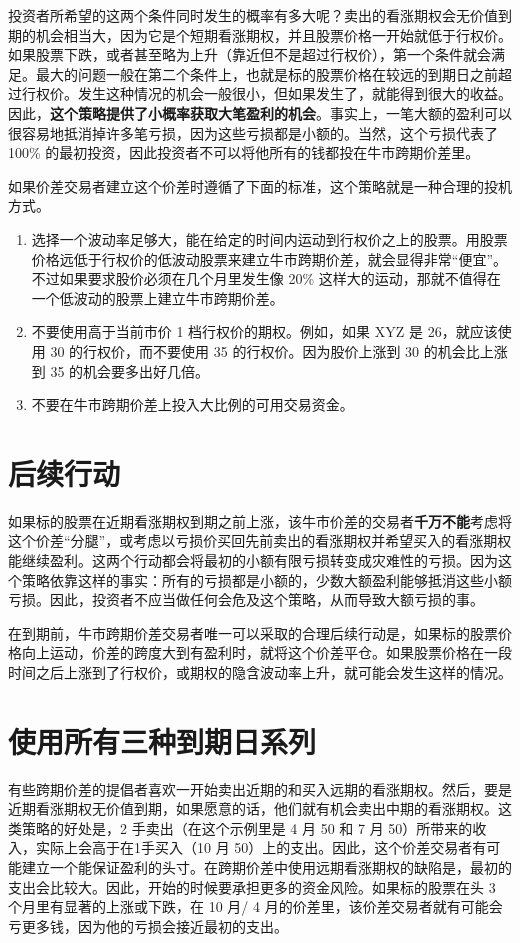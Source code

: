 投资者所希望的这两个条件同时发生的概率有多大呢？卖出的看涨期权会无价值到期的机会相当大，因为它是个短期看涨期权，并且股票价格一开始就低于行权价。如果股票下跌，或者甚至略为上升（靠近但不是超过行权价），第一个条件就会满足。最大的问题一般在第二个条件上，也就是标的股票价格在较远的到期日之前超过行权价。发生这种情况的机会一般很小，但如果发生了，就能得到很大的收益。因此，\textbf{这个策略提供了小概率获取大笔盈利的机会}。事实上，一笔大额的盈利可以很容易地抵消掉许多笔亏损，因为这些亏损都是小额的。当然，这个亏损代表了 100\% 的最初投资，因此投资者不可以将他所有的钱都投在牛市跨期价差里。

如果价差交易者建立这个价差时遵循了下面的标准，这个策略就是一种合理的投机方式。
\begin{enumerate}
    \item 选择一个波动率足够大，能在给定的时间内运动到行权价之上的股票。用股票价格远低于行权价的低波动股票来建立牛市跨期价差，就会显得非常“便宜”。不过如果要求股价必须在几个月里发生像 20\% 这样大的运动，那就不值得在一个低波动的股票上建立牛市跨期价差。
    \item 不要使用高于当前市价 1 档行权价的期权。例如，如果 XYZ 是 26，就应该使用 30 的行权价，而不要使用 35 的行权价。因为股价上涨到 30 的机会比上涨到 35 的机会要多出好几倍。
    \item 不要在牛市跨期价差上投入大比例的可用交易资金。
\end{enumerate}
\section{后续行动}
如果标的股票在近期看涨期权到期之前上涨，该牛市价差的交易者\textbf{千万不能}考虑将这个价差“分腿”，或考虑以亏损价买回先前卖出的看涨期权并希望买入的看涨期权能继续盈利。这两个行动都会将最初的小额有限亏损转变成灾难性的亏损。因为这个策略依靠这样的事实：所有的亏损都是小额的，少数大额盈利能够抵消这些小额亏损。因此，投资者不应当做任何会危及这个策略，从而导致大额亏损的事。

在到期前，牛市跨期价差交易者唯一可以采取的合理后续行动是，如果标的股票价格向上运动，价差的跨度大到有盈利时，就将这个价差平仓。如果股票价格在一段时间之后上涨到了行权价，或期权的隐含波动率上升，就可能会发生这样的情况。
\section{使用所有三种到期日系列}
有些跨期价差的提倡者喜欢一开始卖出近期的和买入远期的看涨期权。然后，要是近期看涨期权无价值到期，如果愿意的话，他们就有机会卖出中期的看涨期权。这类策略的好处是，2 手卖出（在这个示例里是 4 月 50 和 7 月 50）所带来的收入，实际上会高于在1手买入（10 月 50）上的支出。因此，这个价差交易者有可能建立一个能保证盈利的头寸。在跨期价差中使用远期看涨期权的缺陷是，最初的支出会比较大。因此，开始的时候要承担更多的资金风险。如果标的股票在头 3 个月里有显著的上涨或下跌，在 10 月/ 4 月的价差里，该价差交易者就有可能会亏更多钱，因为他的亏损会接近最初的支出。

